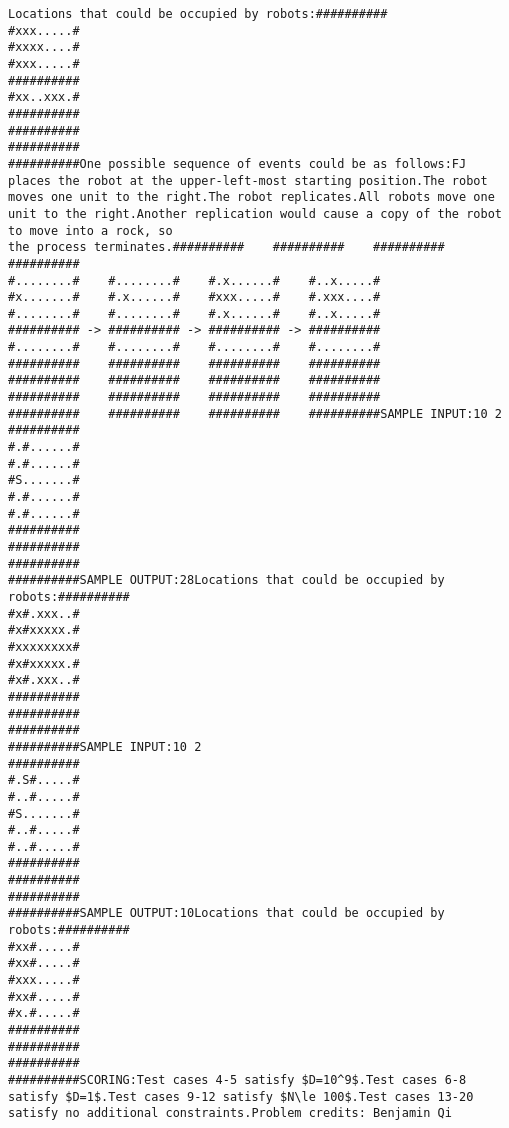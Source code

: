 \documentclass[12pt]{article}
\begin{document}
\begin{verbatim}
Locations that could be occupied by robots:##########
#xxx.....#
#xxxx....#
#xxx.....#
##########
#xx..xxx.#
##########
##########
##########
##########One possible sequence of events could be as follows:FJ places the robot at the upper-left-most starting position.The robot moves one unit to the right.The robot replicates.All robots move one unit to the right.Another replication would cause a copy of the robot to move into a rock, so
the process terminates.##########    ##########    ##########    ##########
#........#    #........#    #.x......#    #..x.....#
#x.......#    #.x......#    #xxx.....#    #.xxx....#
#........#    #........#    #.x......#    #..x.....#
########## -> ########## -> ########## -> ##########
#........#    #........#    #........#    #........#
##########    ##########    ##########    ##########
##########    ##########    ##########    ##########
##########    ##########    ##########    ##########
##########    ##########    ##########    ##########SAMPLE INPUT:10 2
##########
#.#......#
#.#......#
#S.......#
#.#......#
#.#......#
##########
##########
##########
##########SAMPLE OUTPUT:28Locations that could be occupied by robots:##########
#x#.xxx..#
#x#xxxxx.#
#xxxxxxxx#
#x#xxxxx.#
#x#.xxx..#
##########
##########
##########
##########SAMPLE INPUT:10 2
##########
#.S#.....#
#..#.....#
#S.......#
#..#.....#
#..#.....#
##########
##########
##########
##########SAMPLE OUTPUT:10Locations that could be occupied by robots:##########
#xx#.....#
#xx#.....#
#xxx.....#
#xx#.....#
#x.#.....#
##########
##########
##########
##########SCORING:Test cases 4-5 satisfy $D=10^9$.Test cases 6-8 satisfy $D=1$.Test cases 9-12 satisfy $N\le 100$.Test cases 13-20 satisfy no additional constraints.Problem credits: Benjamin Qi


\end{verbatim}
\end{document}
